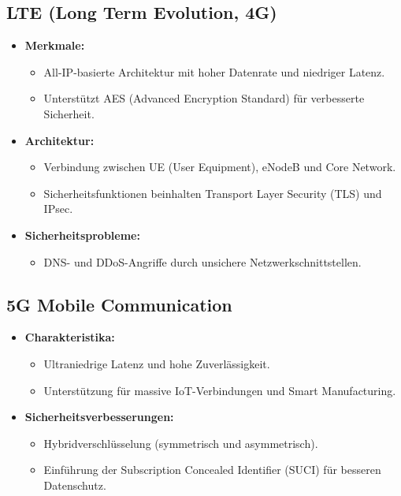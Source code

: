 \documentclass{article}
\begin{document}
\subsection{LTE (Long Term Evolution, 4G)}
\begin{itemize}
    \item \textbf{Merkmale:}
    \begin{itemize}
        \item All-IP-basierte Architektur mit hoher Datenrate und niedriger Latenz.
        \item Unterstützt AES (Advanced Encryption Standard) für verbesserte Sicherheit.
    \end{itemize}
    \item \textbf{Architektur:}
    \begin{itemize}
        \item Verbindung zwischen UE (User Equipment), eNodeB und Core Network.
        \item Sicherheitsfunktionen beinhalten Transport Layer Security (TLS) und IPsec.
    \end{itemize}
    \item \textbf{Sicherheitsprobleme:}
    \begin{itemize}
        \item DNS- und DDoS-Angriffe durch unsichere Netzwerkschnittstellen.
    \end{itemize}
\end{itemize}

\subsection{5G Mobile Communication}
\begin{itemize}
    \item \textbf{Charakteristika:}
    \begin{itemize}
        \item Ultraniedrige Latenz und hohe Zuverlässigkeit.
        \item Unterstützung für massive IoT-Verbindungen und Smart Manufacturing.
    \end{itemize}
    \item \textbf{Sicherheitsverbesserungen:}
    \begin{itemize}
        \item Hybridverschlüsselung (symmetrisch und asymmetrisch).
        \item Einführung der Subscription Concealed Identifier (SUCI) für besseren Datenschutz.
    \end{itemize}
\end{itemize}
\end{document}

